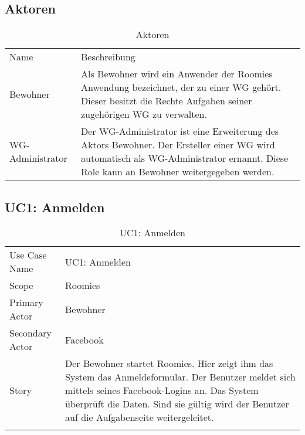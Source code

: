 \subsection{Aktoren}
\begin{table}[H]
	\tablestyle
	\tablealtcolored
	\begin{tabularx}{\textwidth}{lX}
	\tableheadcolor
		\tablehead Name &
		\tablehead Beschreibung \tabularnewline

		\tablebody
			Bewohner &
			Als Bewohner wird ein Anwender der Roomies Anwendung bezeichnet, der zu einer WG gehört. \newline
			Dieser besitzt die Rechte Aufgaben seiner zugehörigen WG zu verwalten.
			\tabularnewline
			WG-Administrator &
			Der WG-Administrator ist eine Erweiterung des Aktors Bewohner. Der Ersteller einer WG wird automatisch als WG-Administrator ernannt. Diese Role kann an Bewohner weitergegeben werden.
	\end{tabularx}
	\caption{Aktoren}
\end{table}

\subsection{UC1: Anmelden}
\begin{table}[H]
	\tablestyle
	\tablealtcolored
	\begin{tabularx}{\textwidth}{lX}
		\tablebody
			Use Case Name &
			UC1: Anmelden
			\tabularnewline
			Scope &
			Roomies
			\tabularnewline
			Primary Actor &
			Bewohner
			\tabularnewline
			Secondary Actor &
			Facebook
			\tabularnewline
			Story &
			Der Bewohner startet Roomies. Hier zeigt ihm das System das Anmeldeformular. Der Benutzer meldet sich mittels seines Facebook-Logins an. Das System überprüft die Daten. Sind sie gültig wird der Benutzer auf die Aufgabenseite weitergeleitet.
			\tabularnewline
		\tableend
	\end{tabularx}
	\caption{UC1: Anmelden}
\end{table}



